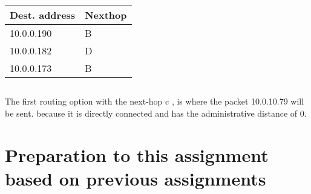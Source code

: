 \documentclass{article}
\begin{document}
\begin{table}[!h]
    \begin{tabular}{|l|l|}
        \hline
        Dest. address & Nexthop \\ \hline
        10.0.0.190    & B       \\ 
        10.0.0.182    & D       \\ 
        10.0.0.173    & B       \\
        \hline
    \end{tabular}
\end{table}


\subsection{}
The first routing option with the next-hop c , is where the packet 10.0.10.79 will be sent. because it is directly connected and has the administrative distance of 0.
\subsection{}

\subsection{}

\subsection{}

\subsection{}

\subsection{}

\subsection{}

\subsection{}

\section{Preparation to this assignment based on previous assignments}
\end{document}
